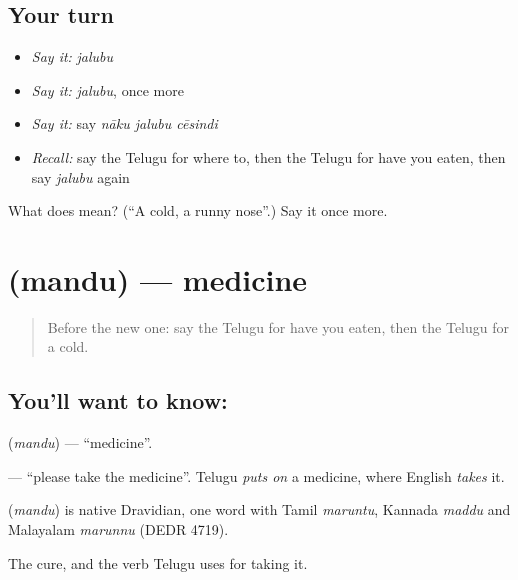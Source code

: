 \subsection*{Your turn}
\begin{itemize}
\raggedright
  \item \emph{Say it:} \emph{jalubu}
  \item \emph{Say it:} \emph{jalubu}, once more
  \item \emph{Say it:} say \emph{nāku jalubu cēsindi}
  \item \emph{Recall:} say the Telugu for where to, then the Telugu for have you eaten, then say \emph{jalubu} again
\end{itemize}

\begin{tcolorbox}[breakable,colback=teal!4,colframe=teal!35!black,title={Before you move on}]
What does  mean? (\textquotedblleft{}A cold, a runny nose\textquotedblright{}.) Say it once more.
\end{tcolorbox}
\section[\texorpdfstring{\te{మందు} (mandu)}{మందు (mandu)}]{ (mandu) — medicine}

\label{lesson:TE-C92-medicine}



\begin{quote}
Before the new one: say the Telugu for have you eaten, then the Telugu for a cold.
\end{quote}

\subsection*{You'll want to know: }
\textbf{} (\emph{mandu}) — \textquotedblleft{}medicine\textquotedblright{}.

\textbf{ } — \textquotedblleft{}please take the medicine\textquotedblright{}. Telugu \emph{puts on} a medicine, where English \emph{takes} it.

\begin{cousinweb}
\textbf{} (\emph{mandu}) is native Dravidian, one word with Tamil \emph{maruntu}, Kannada \emph{maddu} and Malayalam \emph{marunnu} (DEDR 4719).
\end{cousinweb}

\begin{grammarlens}[title={What you've built}]
The cure, and the verb Telugu uses for taking it.
\end{grammarlens}

